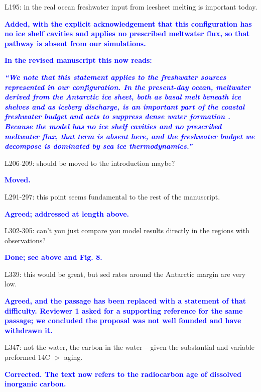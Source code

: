 \documentclass[pdflatex,sn-nature]{sn-jnl}
\begin{document}
\medskip
\noindent L195: in the real ocean freshwater input from icesheet melting is important today.
\medskip

\noindent\textcolor{blue}{\textbf{Added, with the explicit acknowledgement that this configuration has no ice shelf cavities and applies no prescribed meltwater flux, so that pathway is absent from our simulations.}}


\noindent\textcolor{blue}{\textbf{In the revised manuscript this now reads:}}


\medskip
\noindent\textcolor{blue}{\textbf{\textit{``We note that this statement applies to the freshwater sources represented in our configuration. In the present-day ocean, meltwater derived from the Antarctic ice sheet, both as basal melt beneath ice shelves and as iceberg discharge, is an important part of the coastal freshwater budget and acts to suppress dense water formation . Because the model has no ice shelf cavities and no prescribed meltwater flux, that term is absent here, and the freshwater budget we decompose is dominated by sea ice thermodynamics.''}}}
\medskip

\medskip
\noindent L206-209: should be moved to the introduction maybe?
\medskip

\noindent\textcolor{blue}{\textbf{Moved.}}


\medskip
\noindent L291-297: this point seems fundamental to the rest of the manuscript.
\medskip

\noindent\textcolor{blue}{\textbf{Agreed; addressed at length above.}}


\medskip
\noindent L302-305: can't you just compare you model results directly in the regions with observations?
\medskip

\noindent\textcolor{blue}{\textbf{Done; see above and Fig. 8.}}


\medskip
\noindent L339: this would be great, but sed rates around the Antarctic margin are very low.
\medskip

\noindent\textcolor{blue}{\textbf{Agreed, and the passage has been replaced with a statement of that difficulty. Reviewer 1 asked for a supporting reference for the same passage; we concluded the proposal was not well founded and have withdrawn it.}}


\medskip
\noindent L347: not the water, the carbon in the water -- given the substantial and variable preformed 14C $>$ aging.
\medskip

\noindent\textcolor{blue}{\textbf{Corrected. The text now refers to the radiocarbon age of dissolved inorganic carbon.}}
\end{document}
